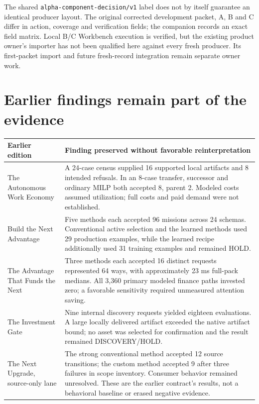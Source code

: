 \documentclass[11pt,a4paper]{article}
\begin{document}
The shared \texttt{alpha-component-decision/v1} label does not by itself guarantee an identical producer layout. The original corrected development packet, A, B and C differ in action, coverage and verification fields; the companion records an exact field matrix. Local B/C Workbench execution is verified, but the existing product owner's  importer has not been qualified here against every fresh producer. Its first-packet import and future fresh-record integration remain separate owner work.\cite{schemas}

\section{Earlier findings remain part of the evidence}

\begin{longtable}{@{}p{}p{}@{}}
\toprule
Earlier edition & Finding preserved without favorable reinterpretation \\
\midrule\endhead
The Autonomous Work Economy & A 24-case census supplied 16 supported local artifacts and 8 intended refusals. In an 8-case transfer, successor and ordinary MILP both accepted 8, parent 2. Modeled costs assumed utilization; full costs and paid demand were not established.\cite{workeconomy} \\
Build the Next Advantage & Five methods each accepted 96 missions across 24 schemas. Conventional active selection and the learned methods used 29 production examples, while the learned recipe additionally used 31 training examples and remained HOLD.\cite{nextadvantage} \\
The Advantage That Funds the Next & Three methods each accepted 16 distinct requests represented 64 ways, with approximately 23 ms full-pack medians. All 3,360 primary modeled finance paths invested zero; a favorable sensitivity required unmeasured attention saving.\cite{fundedadvantage} \\
The Investment Gate & Nine internal discovery requests yielded eighteen evaluations. A large locally delivered artifact exceeded the native artifact bound; no asset was selected for confirmation and the result remained DISCOVERY/HOLD.\cite{investmentgate} \\
The Next Upgrade, source-only lane & The strong conventional method accepted 12 source transitions; the custom method accepted 9 after three failures in scope inventory. Consumer behavior remained unresolved. These are the earlier contract's results, not a behavioral baseline or erased negative evidence.\cite{nextupgrade,criticism} \\
\bottomrule
\end{longtable}
\end{document}
